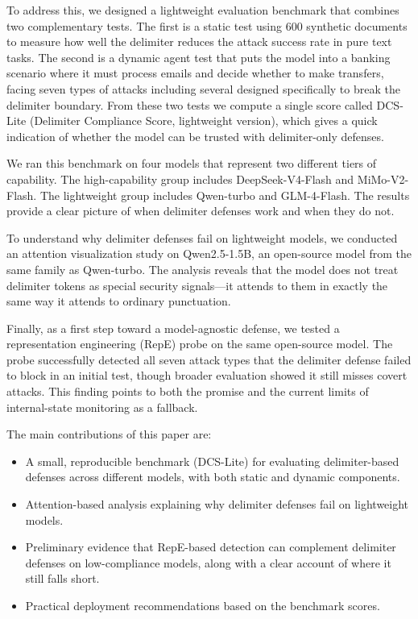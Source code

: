 \documentclass[journal]{IEEEtran}
\begin{document}
To address this, we designed a lightweight evaluation benchmark that combines two complementary tests. The first is a static test using 600 synthetic documents to measure how well the delimiter reduces the attack success rate in pure text tasks. The second is a dynamic agent test that puts the model into a banking scenario where it must process emails and decide whether to make transfers, facing seven types of attacks including several designed specifically to break the delimiter boundary. From these two tests we compute a single score called DCS-Lite (Delimiter Compliance Score, lightweight version), which gives a quick indication of whether the model can be trusted with delimiter-only defenses.

We ran this benchmark on four models that represent two different tiers of capability. The high-capability group includes DeepSeek-V4-Flash and MiMo-V2-Flash. The lightweight group includes Qwen-turbo and GLM-4-Flash. The results provide a clear picture of when delimiter defenses work and when they do not.

To understand why delimiter defenses fail on lightweight models, we conducted an attention visualization study on Qwen2.5-1.5B, an open-source model from the same family as Qwen-turbo. The analysis reveals that the model does not treat delimiter tokens as special security signals---it attends to them in exactly the same way it attends to ordinary punctuation.

Finally, as a first step toward a model-agnostic defense, we tested a representation engineering (RepE) probe on the same open-source model. The probe successfully detected all seven attack types that the delimiter defense failed to block in an initial test, though broader evaluation showed it still misses covert attacks. This finding points to both the promise and the current limits of internal-state monitoring as a fallback.

The main contributions of this paper are:
\begin{itemize}
    \item A small, reproducible benchmark (DCS-Lite) for evaluating delimiter-based defenses across different models, with both static and dynamic components.
    \item Attention-based analysis explaining why delimiter defenses fail on lightweight models.
    \item Preliminary evidence that RepE-based detection can complement delimiter defenses on low-compliance models, along with a clear account of where it still falls short.
    \item Practical deployment recommendations based on the benchmark scores.
\end{itemize}
\end{document}
